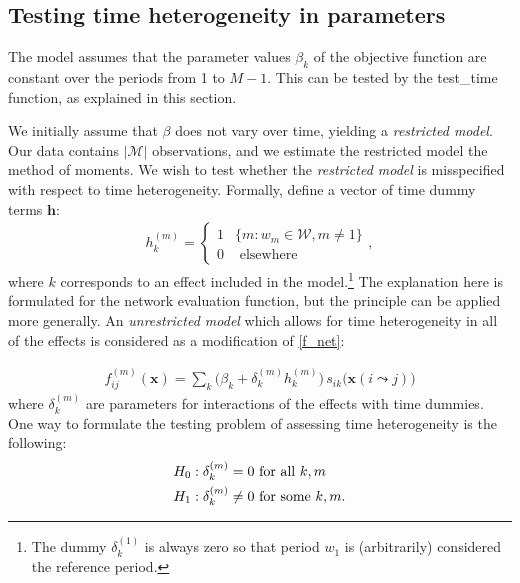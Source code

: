 \documentclass[a4paper,fleqn,11pt]{article}
\newcommand{\+}{\, + \,}
\newcommand{\sfn}[1]{\textsf{#1}}
\begin{document}
\newpage
\subsection{Testing time heterogeneity in parameters}
\label{S_timetest2}

The model assumes that the parameter values $\beta_k$
of the objective function are constant over the periods from 1 to $M-1$.
This can be tested by the \sfn{test\_time} function,
as explained in this section.

We initially assume that $\beta$ does not vary over time, yielding a
\emph{restricted model}. Our data contains $|\mathcal{M}|$ observations, and we
estimate the restricted model the method of moments. We wish to test whether the
\emph{restricted model} is misspecified with respect to time
heterogeneity. Formally, define a vector of time dummy terms $\mathbf{h}$:
\begin{align}
h_k^{(m)}=\left\{
\begin{array}{ll}
1& \{m : w_m \in \mathcal{W}, m \neq 1\}\\
0& \mbox{~elsewhere~}
\end{array}
\right . ,
\end{align}
where $k$ corresponds to an effect included in the model.\footnote{The dummy
  $\delta_k^{(1)}$ is always zero so that period $w_1$ is (arbitrarily)
  considered the reference period.} The explanation here
is formulated for the network evaluation function,
but the principle can be applied more generally.
An \emph{unrestricted model} which allows
for time heterogeneity in all of the effects is considered as a modification of
\eqref{f_net}:

\begin{align}
f^{(m)}_{ij}(\mathbf{x})= \sum_k \Big(\beta_k + \delta_k^{(m)} h_k^{(m)}\Big)
           \, s_{ik}\big(\mathbf{x}(i \leadsto j)\big)
\label{eq:fmij2}
\end{align}
where $\delta_k^{(m)}$ are parameters for interactions of the effects
with time dummies. One way
to formulate the testing problem of assessing time heterogeneity is the
following:
\begin{align}
H_0:\delta_k^{(m)} = 0 & \mbox{~for all~} k,m \notag\\
H_1:\delta_k^{(m)} \neq 0 & \mbox{ for some } k,m .
\label{hyptest}
\end{align}
\end{document}
